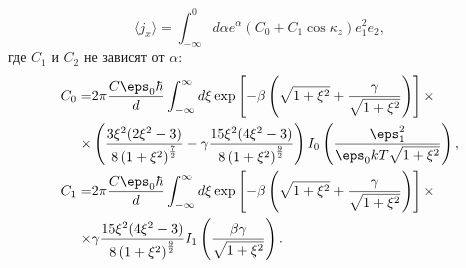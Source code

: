 \begin{equation*}
    \langle j_x \rangle = \int_{-\infty}^0 d\alpha e^\alpha (C_0 +
    C_1\cos\kappa_z)e_1^2e_2,
\end{equation*}
где \( C_1 \) и \( C_2 \) не зависят от \( \alpha \):
\begin{align*}
    C_0 = & 2\pi \frac{C\eps_0\hbar}{d} \int_{-\infty}^\infty d\xi
    \exp\left[-\beta\left(\sqrt{1+\xi^2}+
    \frac{\gamma}{\sqrt{1+\xi^2}}\right)\right]\times\\\times&
    \left( \frac{3\xi^2(2\xi^2-3)}
    {8\left(1 + \xi^2\right)^\frac{7}{2}} -
    \gamma\frac{15\xi^2(4\xi^2-3)}
    {8\left(1 + \xi^2\right)^\frac{9}{2}}\right)
    I_0\left(\frac{\eps_1^2}{\eps_0 kT\sqrt{1+\xi^2}}\right),\\
    C_1 = & 2\pi \frac{C\eps_0\hbar}{d} \int_{-\infty}^\infty d\xi
    \exp\left[-\beta\left(\sqrt{1+\xi^2}+
    \frac{\gamma}{\sqrt{1+\xi^2}}\right)\right]\times\\\times&
    \gamma\frac{15\xi^2(4\xi^2-3)}
    {8\left(1 + \xi^2\right)^\frac{9}{2}}
    I_1\left(\frac{\beta\gamma}{\sqrt{1+\xi^2}}\right).
\end{align*}

